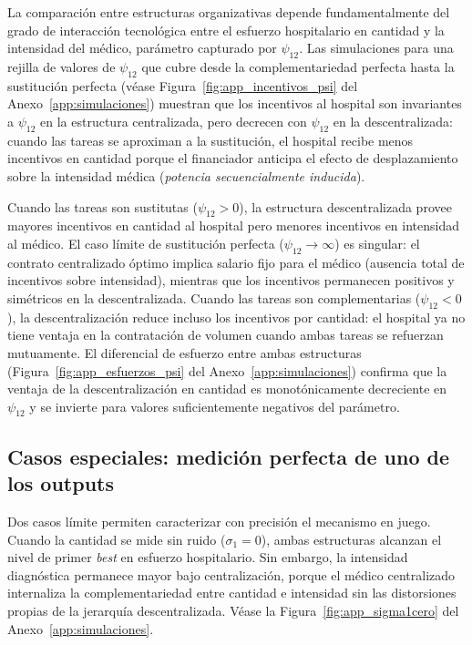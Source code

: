 La comparación entre estructuras organizativas depende fundamentalmente del grado de interacción tecnológica entre el esfuerzo hospitalario en cantidad y la intensidad del médico, parámetro capturado por $\psi_{12}$. Las simulaciones para una rejilla de valores de $\psi_{12}$ que cubre desde la complementariedad perfecta hasta la sustitución perfecta (véase Figura~\ref{fig:app_incentivos_psi} del Anexo~\ref{app:simulaciones}) muestran que los incentivos al hospital son invariantes a $\psi_{12}$ en la estructura centralizada, pero decrecen con $\psi_{12}$ en la descentralizada: cuando las tareas se aproximan a la sustitución, el hospital recibe menos incentivos en cantidad porque el financiador anticipa el efecto de desplazamiento sobre la intensidad médica (\textit{potencia secuencialmente inducida}).

Cuando las tareas son sustitutas ($\psi_{12}>0$), la estructura descentralizada provee mayores incentivos en cantidad al hospital pero menores incentivos en intensidad al médico. El caso límite de sustitución perfecta ($\psi_{12}\to\infty$) es singular: el contrato centralizado óptimo implica salario fijo para el médico (ausencia total de incentivos sobre intensidad), mientras que los incentivos permanecen positivos y simétricos en la descentralizada. Cuando las tareas son complementarias ($\psi_{12}<0$), la descentralización reduce incluso los incentivos por cantidad: el hospital ya no tiene ventaja en la contratación de volumen cuando ambas tareas se refuerzan mutuamente. El diferencial de esfuerzo entre ambas estructuras (Figura~\ref{fig:app_esfuerzos_psi} del Anexo~\ref{app:simulaciones}) confirma que la ventaja de la descentralización en cantidad es monotónicamente decreciente en $\psi_{12}$ y se invierte para valores suficientemente negativos del parámetro.

\subsection{Casos especiales: medición perfecta de uno de los outputs}

Dos casos límite permiten caracterizar con precisión el mecanismo en juego. Cuando la cantidad se mide sin ruido ($\sigma_1=0$), ambas estructuras alcanzan el nivel de primer \textit{best} en esfuerzo hospitalario. Sin embargo, la intensidad diagnóstica permanece mayor bajo centralización, porque el médico centralizado internaliza la complementariedad entre cantidad e intensidad sin las distorsiones propias de la jerarquía descentralizada. Véase la Figura~\ref{fig:app_sigma1cero} del Anexo~\ref{app:simulaciones}.

